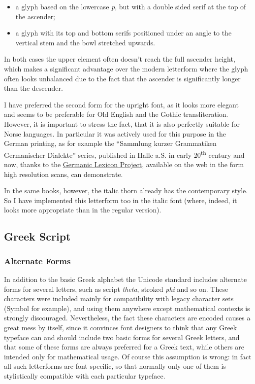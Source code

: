 \documentclass[12pt,a4paper,openany]{book}
\begin{document}
\begin{itemize}

\item a glyph based on the lowercase \textit{p}, but with a double sided
serif at the top of the ascender;

\item a glyph with its top and bottom serifs positioned under an angle to
the vertical stem and the bowl stretched upwards.

\end{itemize}

In both cases the upper element often doesn’t reach the full ascender
height, which makes a significant advantage over the modern letterform
where the glyph often looks unbalanced due to the fact that the ascender is
significantly longer than the descender.

I have preferred the second form for the upright font, as it looks more
elegant and seems to be preferable for Old English and the Gothic
transliteration. However, it is important to stress the fact, that it is
also perfectly suitable for Norse languages. In particular it was actively
used for this purpose in the German printing, as for example the “Sammlung
kurzer Grammatiken Germanischer Dialekte” series, published in Halle a.S.
in early 20\textsuperscript{th} century and now, thanks to the
\href{http://www.ling.upenn.edu/~kurisuto/germanic/language\_resources.html}{Germanic
Lexicon Project}, available on the web in the form high resolution scans, can
demonstrate.

In the same books, however, the italic thorn already has the contemporary
style. So I have implemented this letterform too in the italic font
(where, indeed, it looks more appropriate than in the regular version).

\subsection{Greek Script}

\subsubsection{Alternate Forms}

In addition to the basic Greek alphabet the Unicode standard includes
alternate forms for several letters, such as script \textit{theta}, stroked
\textit{phi} and so on. These characters were included mainly for
compatibility with legacy character sets (Symbol for example), and using
them anywhere except mathematical contexts is strongly discouraged.
Nevertheless, the fact these characters are encoded causes a great mess by
itself, since it convinces font designers to think that any Greek typeface
can and should include two basic forms for several Greek letters, and that
some of these forms are always preferred for a Greek text, while others are
intended only for mathematical usage. Of course this assumption is wrong:
in fact all such letterforms are font-specific, so that normally only one
of them is stylistically compatible with each particular typeface.
\end{document}
